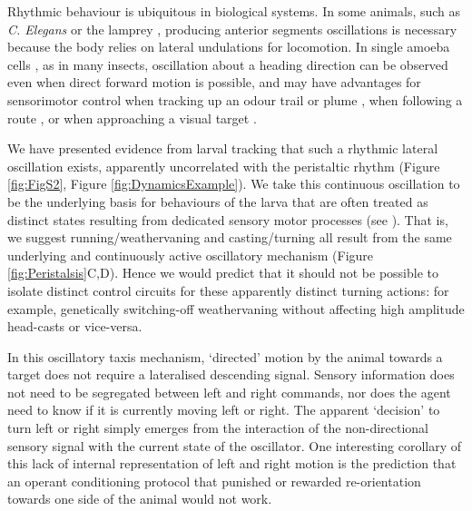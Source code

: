 \documentclass[11pt,a4paper]{article}
\begin{document}
 Rhythmic behaviour is ubiquitous in biological systems. In some animals, such as {\it C. Elegans} \citep{iino2009parallel,izquierdo2010evolution,lockery2011computational}  or the lamprey  \citep{lansner1997realistic,wilson1999spikes}, producing anterior segments oscillations is necessary because the body relies on lateral undulations for locomotion.
 In single amoeba cells \citep{yangzigzag2011}, as in many insects, oscillation about a heading direction can be observed even when direct forward motion is possible, and may have advantages for sensorimotor control when tracking up an odour trail  \citep{hangartner1967german,farkas1972chemical} or plume \citep{budick2006free,belanger1996centrally,willis1997centrally,willis2008effects,carde2008navigational}  , when following a route \citep{lent2010image,kodzhabashev2015route}, or when approaching a visual target \citep{wallace1962experiments,philippides2013bumblebee,voss1998active}.

 We have presented evidence from larval tracking that such a rhythmic lateral oscillation exists, apparently uncorrelated with the peristaltic rhythm (Figure \ref{fig:FigS2}, Figure \ref{fig:DynamicsExample}).
We take this continuous oscillation to be the underlying basis for behaviours of the larva that are often treated as distinct states resulting from dedicated sensory motor processes (see \cite{vogelstein2014discovery, green1983organization, cobbwhatandhow1999, gomez2012active, gomez2014multilevel, hernandez2015reverse,gepner2015computations}).
 That is, we suggest running/weathervaning and casting/turning all result from the same underlying and continuously active oscillatory mechanism (Figure \ref{fig:Peristalsis}C,D).
  Hence we would predict that it should not be possible to isolate distinct control circuits for these apparently distinct turning actions: for example, genetically switching-off weathervaning without affecting high amplitude head-casts or vice-versa.

In this oscillatory taxis mechanism, ‘directed’ motion by the animal towards a target does not require a lateralised descending signal. Sensory information does not need to be segregated between left and right commands, nor does the agent need to know if it is currently moving left or right. The apparent ‘decision’ to turn left or right simply emerges from the interaction of the non-directional sensory signal with the current state of the oscillator. 
One interesting corollary of this lack of internal representation of left and right motion is the prediction that an operant conditioning protocol that punished or rewarded re-orientation towards one side of the animal would not work.
\end{document}
